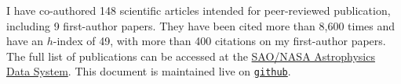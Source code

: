 I have co-authored 148 scientific articles intended for peer-reviewed 
publication, including 9 first-author papers. They have been cited more than 
8,600 times and have an $h$-index of 49, with more than 400 citations on my 
first-author papers. The full list of publications can be accessed at the 
\href{https://goo.gl/LAu9G4}{SAO/NASA Astrophysics Data System}.
%
This document is maintained live on
\href{https://github.com/cristobal-sifon/cv/blob/master/Sifon_publications.pdf}{\texttt{github}}.

